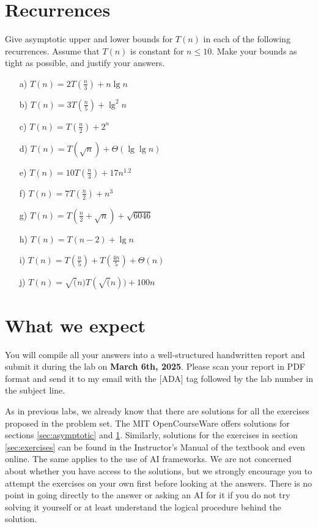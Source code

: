 \documentclass[11pt]{article}
\begin{document}
\section{Recurrences}\label{sec:recurrences}
Give asymptotic upper and lower bounds for $T(n)$ in each of the following recurrences. Assume that $T(n)$ is constant for $n \leq 10$. Make your bounds as tight as possible, and justify your answers.

\begin{enumerate}
    \item[a)] $T(n) = 2T(\frac{n}{3}) + n \lg n$
    \item[b)] $T(n) = 3T(\frac{n}{5}) + \lg^2 n$
    \item[c)] $T(n) =  T(\frac{n}{2}) + 2^n$
    \item[d)] $T(n) =  T(\sqrt{n}) + \Theta(\lg \lg n)$
    \item[e)] $T(n) = 10T(\frac{n}{3}) + 17n^{1.2}$
    \item[f)] $T(n) = 7T(\frac{n}{2}) + n^3$
    \item[g)] $T(n) =  T(\frac{n}{2} + \sqrt{n}) + \sqrt{6046}$
    \item[h)] $T(n) =  T(n - 2) + \lg n$
    \item[i)] $T(n) =  T(\frac{n}{5}) + T(\frac{4n}{5}) + \Theta(n)$
    \item[j)] $T(n) = \sqrt(n)T(\sqrt(n)) + 100n$
\end{enumerate}

\section{What we expect}
You will compile all your answers into a well-structured handwritten report and submit it during the lab on \textbf{March 6th, 2025}. Please scan your report in PDF format and send it to my email with the [ADA] tag followed by the lab number in the subject line.

As in previous labs, we already know that there are solutions for all the exercises proposed in the problem set. The MIT OpenCourseWare offers solutions for sections \ref{sec:asymptotic} and \ref{sec:recurrences}. Similarly, solutions for the exercises in section \ref{sec:exercises} can be found in the Instructor's Manual of the textbook and even online. The same applies to the use of AI frameworks. We are not concerned about whether you have access to the solutions, but we strongly encourage you to attempt the exercises on your own first before looking at the answers. There is no point in going directly to the answer or asking an AI for it if you do not try solving it yourself or at least understand the logical procedure behind the solution.
\end{document}
